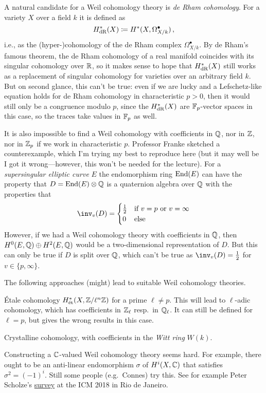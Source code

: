 \begin{cntx}
A natural candidate for a Weil cohomology theory is \emph{de Rham cohomology}. For a variety $X$ over a field $k$ it is defined as 
\begin{equation*}
	H_{\mathrm{dR}}^*(X)\coloneqq H^*(X,\Omega_{X/k}^\bullet)\,,
\end{equation*}
i.e., as the (hyper-)cohomology of the de Rham complex $\Omega_{X/k}^\bullet$.	By de Rham's famous theorem, the de Rham cohomology of a real manifold coincides with its singular cohomology over $\mathbb{R}$, so it makes sense to hope that $H_{\mathrm{dR}}^*(X)$ still works as a replacement of singular cohomology for varieties over an arbitrary field $k$. But on second glance, this can't be true: even if we are lucky and a Lefschetz-like equation holds for de Rham cohomology in characteristic $p >0$, then it would still only be a congruence modulo $p$, since the $H_{\mathrm{dR}}^*(X)$ are $\mathbb{F}_p$-vector spaces in this case, so the traces take values in $\mathbb{F}_p$ as well.
\end{cntx}
\begin{cntx}
It is also impossible to find a Weil cohomology with coefficients in $\mathbb{Q}$, nor in $\mathbb{Z}$, nor in $\mathbb{Z}_p$ if we work in characteristic $p$. Professor Franke sketched a counterexample, which I'm trying my best to reproduce here (but it may well be I got it wrong---however, this won't be needed for the lecture). For a \emph{supersingular elliptic curve} $E$ the endomorphism ring $\operatorname{End}(E)$ can have the property that $D=\operatorname{End}(E)\otimes \mathbb{Q}$ is a quaternion algebra over $\mathbb{Q}$ with the properties that
\begin{align*}
	\inv_v(D)=\begin{cases}
		\frac{1}{2} & \text{if }v=p\text{ or }v=\infty\\
		0 & \text{else}
	\end{cases}
\end{align*}
However, if we had a Weil cohomology theory with coefficients in $\mathbb{Q}$, then $H^0(E,\mathbb{Q})\oplus H^2(E,\mathbb{Q})$ would be a two-dimensional representation of $D$. But this can only be true if $D$ is split over $\mathbb{Q}$, which can't be true as $\inv_v(D)=\frac12$ for $v\in\{p,\infty\}$.
\end{cntx}
 The following approaches (might) lead to suitable Weil cohomology theories.
\begin{alphanumerate}
	\item Étale cohomology $H_{\mathrm{\acute{e}t}}^*(X,\mathbb{Z}/\ell^n\mathbb{Z})$ for a prime $\ell\neq p$. This will lead to $\ell$-adic cohomology, which has coefficients in $\mathbb{Z}_\ell$ resp.\ in $\mathbb{Q}_\ell$. It can still be defined for $\ell=p$, but gives the wrong results in this case.
	\item Crystalline cohomology, with coefficients in the \emph{Witt ring} $W(k)$.
	\item Constructing a $\mathbb{C}$-valued Weil cohomology theory seems hard. For example, there ought to be an anti-linear endomorphism $\sigma$ of $H^i(X,\mathbb{C})$ that satisfies $\sigma^2=(-1)^i$. Still some people (e.g.\ Connes) try this. See for example Peter Scholze's \href{http://www.math.uni-bonn.de/people/scholze/Rio.pdf}{survey} at the ICM 2018 in Rio de Janeiro.
\end{alphanumerate}
